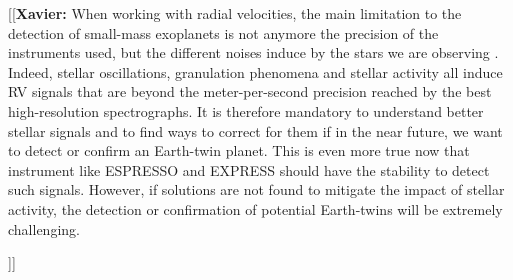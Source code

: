 \documentclass[11pt, oneside]{article}
\newcommand{\xavier}[1]{{\color{blue}[[\textbf{Xavier: }#1]]}}
\begin{document}
\xavier{When working with radial velocities, the main limitation to the detection of small-mass exoplanets is not anymore the precision of the instruments used, but the different noises induce by the stars we are observing \citep[][]{Dumusque:2017aa}. Indeed, stellar oscillations, granulation phenomena and stellar activity all induce RV signals \citep[e.g.][]{Saar-1997b, Queloz-2001, Desort-2007, Dumusque-2011a} that are beyond the meter-per-second precision reached by the best high-resolution spectrographs. It is therefore mandatory to understand better stellar signals and to find ways to correct for them if in the near future, we want to detect or confirm an Earth-twin planet. This is even more true now that instrument like ESPRESSO \citep{Pepe-2014} and EXPRESS \citep{Fischer:2017aa} should have the stability to detect such signals. However, if solutions are not found to mitigate the impact of stellar activity, the detection or confirmation of potential Earth-twins will be extremely challenging.


}
\end{document}
